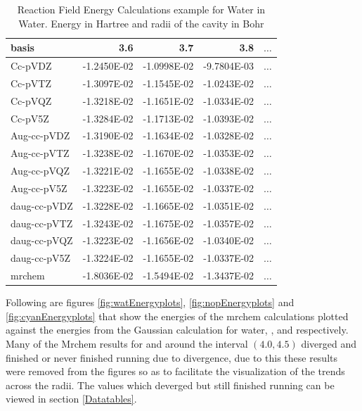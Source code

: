 \documentclass[../master_thesis.tex]{subfiles}
\begin{document}
\begin{table}[htbp]
\caption{Reaction Field Energy Calculations example for Water in Water. Energy in Hartree and radii of the cavity in Bohr}
\begin{center}
\begin{tabular}{|l|r|r|r|r|}
\hline
basis & 3.6 & 3.7 & 3.8 & $\ldots$\\ \hline
Cc-pVDZ & -1.2450E-02 & -1.0998E-02 & -9.7804E-03 & $\ldots$\\ \hline
Cc-pVTZ & -1.3097E-02 & -1.1545E-02 & -1.0243E-02 & $\ldots$\\ \hline
Cc-pVQZ & -1.3218E-02 & -1.1651E-02 & -1.0334E-02 & $\ldots$\\ \hline
Cc-pV5Z & -1.3284E-02 & -1.1713E-02 & -1.0393E-02 & $\ldots$\\ \hline
Aug-cc-pVDZ & -1.3190E-02 & -1.1634E-02 & -1.0328E-02 & $\ldots$\\ \hline
Aug-cc-pVTZ & -1.3238E-02 & -1.1670E-02 & -1.0353E-02 & $\ldots$\\ \hline
Aug-cc-pVQZ & -1.3221E-02 & -1.1655E-02 & -1.0338E-02 & $\ldots$\\ \hline
Aug-cc-pV5Z & -1.3223E-02 & -1.1655E-02 & -1.0337E-02 & $\ldots$\\ \hline
daug-cc-pVDZ & -1.3228E-02 & -1.1665E-02 & -1.0351E-02 & $\ldots$\\ \hline
daug-cc-pVTZ & -1.3243E-02 & -1.1675E-02 & -1.0357E-02 & $\ldots$\\ \hline
daug-cc-pVQZ & -1.3223E-02 & -1.1656E-02 & -1.0340E-02 & $\ldots$\\ \hline
daug-cc-pV5Z & -1.3224E-02 & -1.1655E-02 & -1.0337E-02 & $\ldots$\\ \hline
mrchem & -1.8036E-02 & -1.5494E-02 & -1.3437E-02 & $\ldots$\\ \hline
\end{tabular}
\end{center}
\label{tab:Erwatdata}
\end{table}

Following are figures \ref{fig:watEnergyplots},
\ref{fig:nopEnergyplots} and \ref{fig:cyanEnergyplots}
that show the energies of the mrchem calculations plotted
against the energies from the Gaussian calculation for water, , and
 respectively. Many of the Mrchem results for  and 
around the interval $(4.0, 4.5)$ diverged and finished or never finished
running due to divergence, due to this these results were removed from the figures so as to facilitate
the visualization of the trends across the radii. The values which deverged but still
finished running can be viewed in section \ref{Datatables}.
\end{document}

